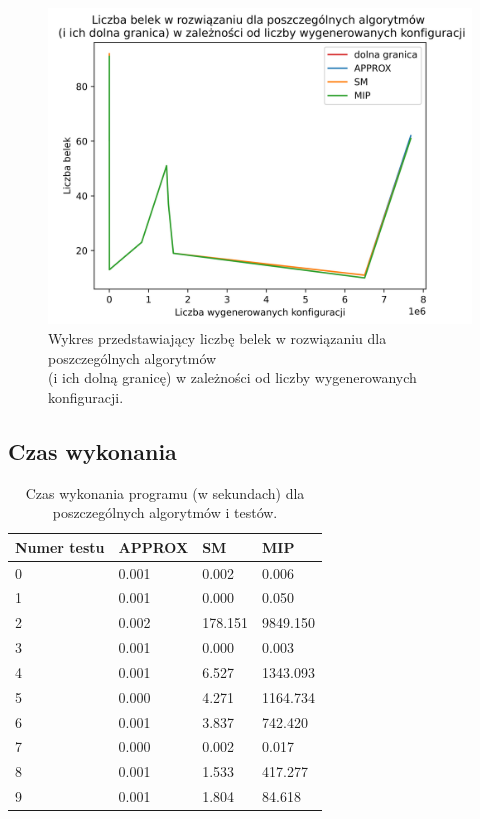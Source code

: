 \begin{figure}[H]
	\begin{center}
		\includegraphics[width=12cm]{plots/res_configs}
		\caption{Wykres przedstawiający liczbę belek w rozwiązaniu dla poszczególnych algorytmów \\ (i ich dolną granicę) w zależności od liczby wygenerowanych konfiguracji.}
	\end{center}
\end{figure}

\subsection{Czas wykonania}


\begin{table}[H] 
	\begin{center}
		\begin{tabular}{|p{3cm}|p{3cm}|p{3cm}|p{3cm}| } \hline
			Numer testu & APPROX & SM & MIP\\ 
			\hline
			0 & 0.001 & 0.002 & 0.006\\ 
			1 & 0.001 & 0.000 & 0.050\\ 
			2 & 0.002 & 178.151 & 9849.150\\ 
			3 & 0.001 & 0.000 & 0.003\\ 
			4 & 0.001 & 6.527 & 1343.093\\ 
			5 & 0.000 & 4.271 & 1164.734\\ 
			6 & 0.001 & 3.837 & 742.420\\ 
			7 & 0.000 & 0.002 & 0.017\\ 
			8 & 0.001 & 1.533 & 417.277\\ 
			9 & 0.001 & 1.804 & 84.618\\ 
			\hline
		\end{tabular}
		\caption{Czas wykonania programu (w sekundach) dla poszczególnych algorytmów i testów.}
	\end{center}
\end{table}

